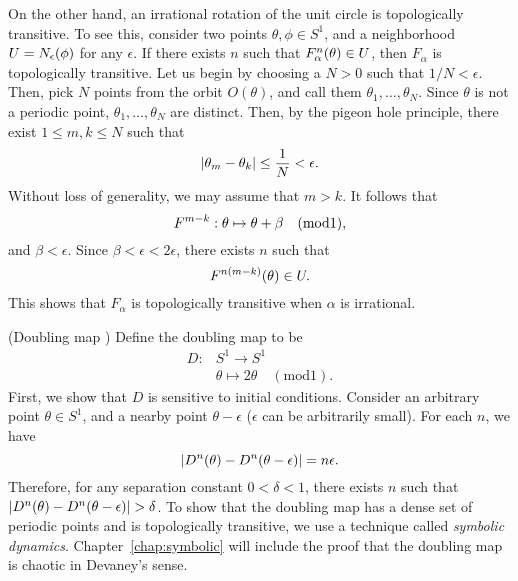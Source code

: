 \documentclass[10pt,draft,twoside]{book}
\begin{document}
\begin{example}
On the other hand, an irrational rotation of the unit circle is topologically transitive.
To see this, consider two points $\theta, \phi \in S^1$, and a neighborhood $U = N_{\epsilon}(\phi)$ for any $\epsilon$.
If there exists $n$ such that $F_\alpha^{n}(\theta) \in U$, then $F_\alpha$ is topologically transitive.
Let us begin by choosing a $N > 0$ such that $1/N < \epsilon$.
Then, pick $N$ points from the orbit $O(\theta)$, and call them $\theta_1, \ldots, \theta_N$.
Since $\theta$ is not a periodic point, $\theta_1, \ldots, \theta_N$ are distinct.
Then, by the pigeon hole principle, there exist $1 \leq m,k \leq N$ such that
\begin{equation*}
  \left |  \theta_m - \theta_k  \right | \leq \frac{1}{N} < \epsilon.
\end{equation*}
Without loss of generality, we may assume that $m > k$.
It follows that 
\begin{equation*}
  F^{m - k}: \theta \mapsto \theta + \beta \quad(\mathrm{mod} 1),
\end{equation*}
and $\beta < \epsilon$.
Since $\beta < \epsilon < 2\epsilon$, there exists $n$ such that
\begin{equation*}
  F^{n(m-k)}(\theta) \in U.
\end{equation*}
This shows that $F_\alpha$ is topologically transitive when $\alpha$ is irrational.
\end{example}
\begin{example}
  (Doubling map \citep{devaney})
  Define the doubling map to be 
  \begin{align*}
    D: &S^1 \to S^1  \\
    &\theta \mapsto 2\theta \quad(\mathrm{mod} 1).
  \end{align*}
  First, we show that $D$ is sensitive to initial conditions. 
  Consider an arbitrary point $\theta \in S^1$, and a nearby point $\theta - \epsilon$ ($\epsilon$ can be arbitrarily small).
  For each $n$, we have
  \begin{equation*}
    \left |  D^{n}(\theta) - D^{n}(\theta - \epsilon)  \right | 
    = 
    n\epsilon.
  \end{equation*}
  Therefore, for any separation constant $0 < \delta < 1$, there exists $n$ such that $\left |  D^{n}(\theta) - D^{n}(\theta - \epsilon)  \right | > \delta$.
  To show that the doubling map has a dense set of periodic points and is topologically transitive, we use a technique called \textit{symbolic dynamics}.
  Chapter~\ref{chap:symbolic} will include the proof that the doubling map is chaotic in Devaney's sense.
\end{example}
\end{document}
